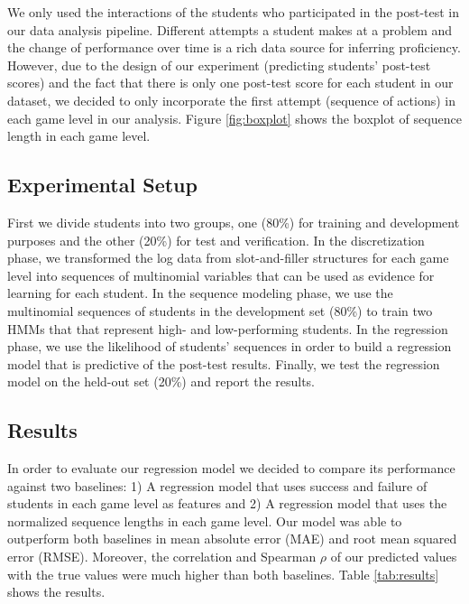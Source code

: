 \documentclass{sigchi}
\begin{document}
We only used the interactions of the students who participated in the post-test in our data analysis pipeline.
Different attempts a student makes at a problem and the change of performance over time is a rich data source for inferring proficiency.
However, due to the design of our experiment (predicting students' post-test scores) and the fact that there is only one post-test score for each student in our dataset, we decided to  only incorporate the first attempt (sequence of actions) in each game level in our analysis. Figure \ref{fig:boxplot} shows the boxplot of sequence length in each game level. 

\subsection{Experimental Setup}
First we divide students into two groups, one (80\%) for training and development purposes and the other (20\%) for test and verification.
In the discretization phase, we transformed the log data from slot-and-filler structures for each game level into sequences of multinomial variables that can be used as evidence for learning for each student.
In the sequence modeling phase, we use the multinomial sequences of students in the development set (80\%) to train two HMMs that that represent high- and low-performing students.
In the regression phase, we use the likelihood of students' sequences in order to build a regression model that is predictive of the post-test results.
Finally, we test the regression model on the held-out set (20\%) and report the results.


\subsection{Results}
In order to evaluate our regression model we decided to compare its performance against two baselines: 1) A regression model that uses success and failure of students in each game level as features and 2) A regression model that uses the normalized sequence lengths in each game level. 
Our model was able to outperform both baselines in mean absolute error (MAE) and root mean squared error (RMSE). 
Moreover, the correlation and Spearman $\rho$ of our predicted values with the true values were much higher than both baselines. 
Table \ref{tab:results} shows the results.
\end{document}
